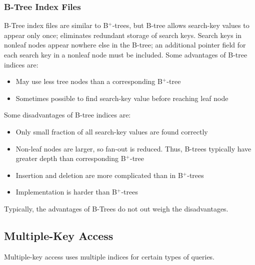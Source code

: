 \documentclass{article}
\begin{document}
\subsubsection{B-Tree Index Files}

B-Tree index files are similar to B$^{+}$-trees, but B-tree allows search-key values to appear only once; eliminates redundant storage of search keys. Search keys in nonleaf nodes appear nowhere else in the B-tree; an additional pointer field for each search key in a nonleaf node must be included. Some advantages of B-tree indices are: 
\begin{itemize}
  \item May use less tree nodes than a corresponding B$^{+}$-tree
  \item Sometimes possible to find search-key value before reaching leaf node 
\end{itemize}
Some disadvantages of B-tree indices are: 
\begin{itemize}
  \item Only small fraction of all search-key values are found correctly
  \item Non-leaf nodes are larger, so fan-out is reduced. Thus, B-trees typically have greater depth than corresponding B$^{+}$-tree 
  \item Insertion and deletion are more complicated than in B$^{+}$-trees 
  \item Implementation is harder than B$^{+}$-trees 
\end{itemize}
Typically, the advantages of B-Trees do not out weigh the disadvantages. 

\subsection{Multiple-Key Access}

Multiple-key access uses multiple indices for certain types of queries. 
\end{document}
